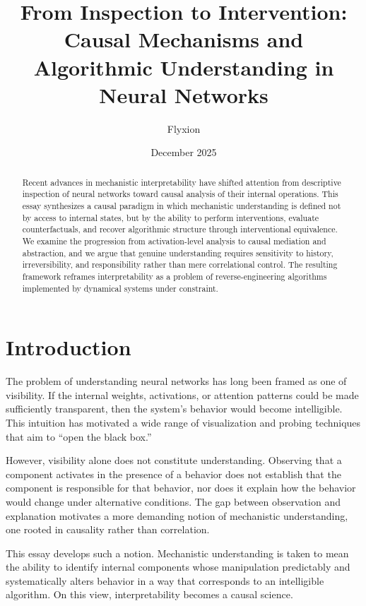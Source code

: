 \documentclass[11pt]{article}
\title{From Inspection to Intervention:\\
Causal Mechanisms and Algorithmic Understanding in Neural Networks}
\author{Flyxion}
\date{December 2025}
\begin{document}
\maketitle

\begin{abstract}

Recent advances in mechanistic interpretability have shifted attention from
descriptive inspection of neural networks toward causal analysis of their
internal operations. This essay synthesizes a causal paradigm in which
mechanistic understanding is defined not by access to internal states, but by
the ability to perform interventions, evaluate counterfactuals, and recover
algorithmic structure through interventional equivalence. We examine the
progression from activation-level analysis to causal mediation and abstraction,
and we argue that genuine understanding requires sensitivity to history,
irreversibility, and responsibility rather than mere correlational control. The
resulting framework reframes interpretability as a problem of reverse-engineering
algorithms implemented by dynamical systems under constraint.

\end{abstract}

\section{Introduction}

The problem of understanding neural networks has long been framed as one of
visibility. If the internal weights, activations, or attention patterns could be
made sufficiently transparent, then the system’s behavior would become
intelligible. This intuition has motivated a wide range of visualization and
probing techniques that aim to ``open the black box.''

However, visibility alone does not constitute understanding. Observing that a
component activates in the presence of a behavior does not establish that the
component is responsible for that behavior, nor does it explain how the behavior
would change under alternative conditions. The gap between observation and
explanation motivates a more demanding notion of mechanistic understanding, one
rooted in causality rather than correlation.

This essay develops such a notion. Mechanistic understanding is taken to mean
the ability to identify internal components whose manipulation predictably and
systematically alters behavior in a way that corresponds to an intelligible
algorithm. On this view, interpretability becomes a causal science.
\end{document}
